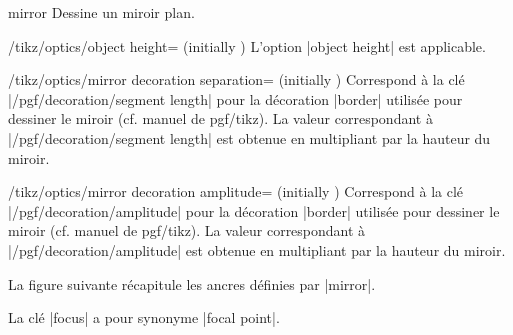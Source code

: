 \documentclass[a4paper]{ltxdoc}
\begin{document}
\begin{shape}{mirror}
Dessine un miroir plan.

\begin{codeexample}[width=6cm]
\end{codeexample}

\begin{key}{/tikz/optics/object height= (initially )}
    L'option |object height| est applicable.
\end{key}

\begin{key}{/tikz/optics/mirror decoration separation= (initially )}
Correspond à la clé |/pgf/decoration/segment length| pour la décoration |border| utilisée pour dessiner le miroir (cf. manuel de pgf/tikz).
La valeur correspondant à |/pgf/decoration/segment length| est obtenue en multipliant  par la hauteur du miroir.
\end{key}

\begin{key}{/tikz/optics/mirror decoration amplitude= (initially )}
Correspond à la clé |/pgf/decoration/amplitude| pour la décoration |border| utilisée pour dessiner le miroir (cf. manuel de pgf/tikz).
La valeur correspondant à |/pgf/decoration/amplitude| est obtenue en multipliant  par la hauteur du miroir.
\end{key}


La figure suivante récapitule les ancres définies par |mirror|.

\begin{codeexample}[]
\Huge
{}
\end{codeexample}

La clé |focus| a pour synonyme |focal point|.

\end{shape}
\end{document}
